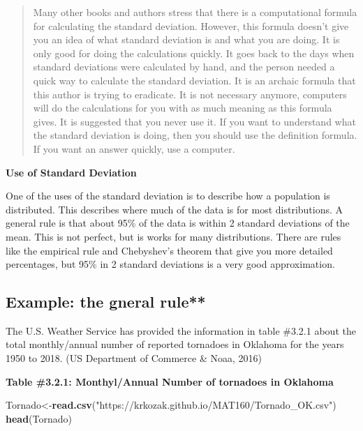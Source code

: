 \documentclass[]{book}
\newenvironment{Shaded}{\begin{snugshade}}{\end{snugshade}}
\newcommand{\KeywordTok}[1]{\textcolor[rgb]{0.13,0.29,0.53}{\textbf{#1}}}
\newcommand{\NormalTok}[1]{#1}
\newcommand{\StringTok}[1]{\textcolor[rgb]{0.31,0.60,0.02}{#1}}
\begin{document}
\begin{quote}
Many other books and authors stress that there is a computational formula for calculating the standard deviation. However, this formula doesn't give you an idea of what standard deviation is and what you are doing. It is only good for doing the calculations quickly. It goes back to the days when standard deviations were calculated by hand, and the person needed a quick way to calculate the standard deviation. It is an archaic formula that this author is trying to eradicate. It is not necessary anymore, computers will do the calculations for you with as much meaning as this formula gives. It is suggested that you never use it. If you want to understand what the standard deviation is doing, then you should use the definition formula. If you want an answer quickly, use a computer.
\end{quote}

\textbf{Use of Standard Deviation}

One of the uses of the standard deviation is to describe how a population is distributed. This describes where much of the data is for most distributions. A general rule is that about 95\% of the data is within 2 standard deviations of the mean. This is not perfect, but is works for many distributions. There are rules like the empirical rule and Chebyshev's theorem that give you more detailed percentages, but 95\% in 2 standard deviations is a very good approximation.

\hypertarget{example-the-gneral-rule}{%
\subsection{Example: the gneral rule**}\label{example-the-gneral-rule}}

The U.S. Weather Service has provided the information in table \#3.2.1 about the total monthly/annual number of reported tornadoes in Oklahoma for the years 1950 to 2018. (US Department of Commerce \& Noaa, 2016)

\textbf{Table \#3.2.1: Monthyl/Annual Number of tornadoes in Oklahoma}

\begin{Shaded}
\begin{Highlighting}[]
\NormalTok{Tornado<-}\KeywordTok{read.csv}\NormalTok{(}\StringTok{"https://krkozak.github.io/MAT160/Tornado_OK.csv"}\NormalTok{)}
\KeywordTok{head}\NormalTok{(Tornado)}
\end{Highlighting}
\end{Shaded}
\end{document}
